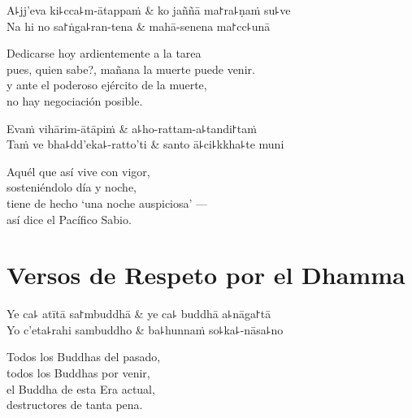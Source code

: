 \begin{twochants}
  A꜕jj'eva ki꜕cca꜕m-ātappaṁ & ko jaññā ma꜓ra꜕ṇaṁ su꜕ve \\
  Na hi no sa꜓ṅga꜕ran-tena & mahā-senena ma꜓cc꜕unā \\
\end{twochants}

\begin{english}
  Dedicarse hoy ardientemente a la tarea\\
  pues, quien sabe?, mañana la muerte puede venir.\\
  y ante el poderoso ejército de la muerte,\\
  no hay negociación posible.
\end{english}

\clearpage

\begin{twochants}
  Evaṁ vihārim-ātāpiṁ & a꜕ho-rattam-a꜕tandi꜓taṁ \\
  Taṁ ve bha꜕dd'eka꜕-ratto'ti & santo ā꜕ci꜕kkha꜕te muni \\
\end{twochants}

\begin{english}
  Aquél que así vive con vigor,\\
  sosteniéndolo día y noche,\\
  tiene de hecho `una noche auspiciosa’ ---\\
  así dice el Pacífico Sabio.
\end{english}

\chapter{Versos de Respeto por el Dhamma}


\begin{leader}
\end{leader}

\begin{twochants}
  Ye ca꜕ atītā sa꜓mbuddhā & ye ca꜕ buddhā a꜕nāga꜓tā \\
  Yo c'eta꜕rahi sambuddho & ba꜕hunnaṁ so꜕ka꜕-nāsa꜕no \\
\end{twochants}

\begin{english}
  Todos los Buddhas del pasado,\\
  todos los Buddhas por venir,\\
  el Buddha de esta Era actual,\\
  destructores de tanta pena.
\end{english}

